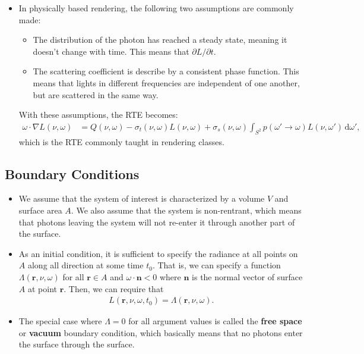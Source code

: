 \documentclass[10pt]{article}
\newcommand{\dee}{\mathrm{d}}
\newcommand{\ve}[1]{\mathbf{#1}}
\newcommand{\ra}{\rightarrow}
\begin{document}
\begin{itemize}
    \item In physically based rendering, the following two assumptions are commonly made:
    \begin{itemize}
      \item The distribution of the photon has reached a steady state, meaning it doesn't change with time. This means that $\partial L / \partial t$.
      \item The scattering coefficient is describe by a consistent phase function. This means that lights in different frequencies are independent of one another, but are scattered in the same way.
    \end{itemize}
    With these assumptions, the RTE becomes:
    \begin{align*}
      \omega \cdot \nabla L(\nu,\omega)
      &= Q(\nu,\omega) - \sigma_t(\nu,\omega) L(\nu,\omega)
      +  \sigma_s(\nu,\omega) \int_{S^2} p(\omega' \ra \omega) L(\nu, \omega')\, \dee \omega',
    \end{align*}
    which is the RTE commonly taught in rendering classes.
  \end{itemize}

  \subsection{Boundary Conditions}
  \begin{itemize}
    \item We assume that the system of interest is characterized by a volume $V$ and surface area $A$. We also assume that the system is non-rentrant, which means that photons leaving the system will not re-enter it through another part of the surface.

    \item As an initial condition, it is sufficient to specify the radiance at all points on $A$ along all direction at some time $t_0$. That is, we can specify a function $\Lambda(\ve{r}, \nu, \omega)$ for all $\ve{r} \in A$ and $\omega \cdot \ve{n} < 0$ where $\ve{n}$  is the normal vector of surface $A$ at point $\ve{r}$. Then, we can require that
    \begin{align*}
      L(\ve{r}, \nu, \omega, t_0) = \Lambda(\ve{r}, \nu, \omega).
    \end{align*}

    \item The special case where $\Lambda = 0$ for all argument values is called the \textbf{free space} or \textbf{vacuum} boundary condition, which basically means that no photons enter the surface through the surface.
  \end{itemize}
\end{document}
